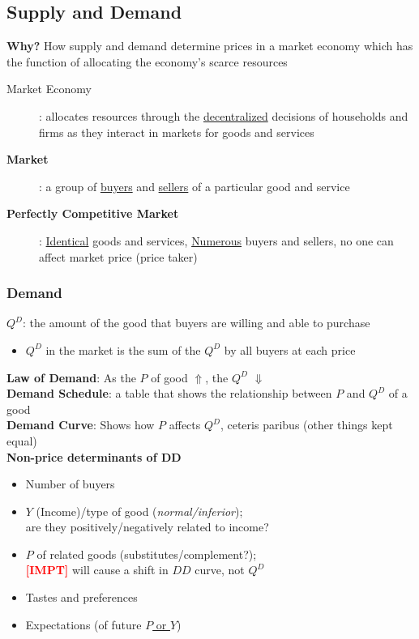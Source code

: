 \documentclass{article}
\newcommand{\impt}[0]{\textcolor{red}{\textbf{[IMPT] }}}
\begin{document}
\begin{multicols}{2}
\subsection{Supply and Demand}
\textbf{Why?} How supply and demand determine prices in a market economy which has the function of allocating the economy's scarce resources\\
\begin{description}
	\item[{Market Economy}]: allocates resources through the \underline{decentralized} decisions of households and firms as they interact in markets for goods and services
	\item [\textbf{Market}]: a group of \underline{buyers} and \underline{sellers} of a particular good and service
	\item [\textbf{Perfectly Competitive Market}]: \underline{Identical} goods and services, \underline{Numerous} buyers and sellers, no one can affect market price (price taker)
\end{description}

\subsubsection{Demand}
$Q^D$: the amount of the good that buyers are willing and able to purchase
\begin{itemize}
	\item $Q^D$ in the market is the sum of the $Q^D$ by all buyers at each price\\
\end{itemize}
\textbf{Law of Demand}: As the $P$ of good $\Uparrow$, the $Q^D$ $\Downarrow$\\
\textbf{Demand Schedule}: a table that shows the relationship between $P$ and $Q^D$ of a good\\
\textbf{Demand Curve}: Shows how $P$ affects $Q^D$, ceteris paribus (other things kept equal)\\

\textbf{Non-price determinants of DD}
\begin{itemize}
	\item Number of buyers
	\item $Y$ (Income)/type of good (\textit{normal/inferior});\\are they positively/negatively related to income?
	\item $P$ of related goods (substitutes/complement?);\\ \impt will cause a shift in $DD$ curve, not $Q^D$
	\item Tastes and preferences
	\item Expectations (of future \underline{$P$ or $Y$})
\end{itemize}


\end{multicols}
\end{document}
